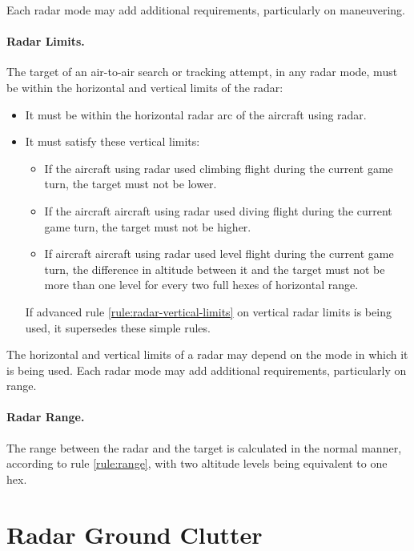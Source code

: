 {Each radar mode may add additional requirements, particularly on maneuvering.

\paragraph{Radar Limits.}
\label{rule:radar-arc-requirements}
The target of an air-to-air search or tracking attempt, in any radar mode, must be within the horizontal and vertical limits of the radar:

    \begin{itemize}

    \item It must be within the horizontal radar arc of the aircraft using radar.

    \item It must satisfy these vertical limits:
    \begin{itemize}
        \item If the aircraft using radar used climbing flight during the current game turn, the target must not be lower.
        \item If the aircraft aircraft using radar used diving flight during the current game turn, the target must not be higher.
        \item If aircraft aircraft using radar used level flight during the current game turn, the difference in altitude between it and the target must not be more than one level for every two full hexes of horizontal range.
    \end{itemize}

    If advanced rule \ref{rule:radar-vertical-limits} on vertical radar limits is being used, it supersedes these simple rules.
    
\end{itemize}

The horizontal and vertical limits of a radar may depend on the mode in which it is being used. Each radar mode may add additional requirements, particularly on range. 

\paragraph{Radar Range.}
The range between the radar and the target is calculated in the normal manner, according to rule \ref{rule:range}, with two altitude levels being equivalent to one hex.

\section{Radar Ground Clutter}
\label{rule:radar-ground-clutter}

}
